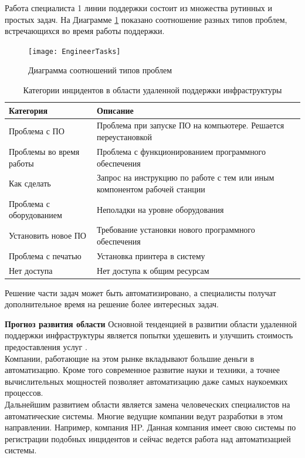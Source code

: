 Работа специалиста 1 линии поддержки состоит из множества рутинных и простых задач. На Диаграмме \ref{img:EngineerTasks}  показано соотношение разных типов проблем, встречающихся во время работы поддержки.

\begin{figure} [h] 
  \center
  \texttt{[image: EngineerTasks]}
  \caption{Диаграмма соотношений типов проблем} 
  \label{img:EngineerTasks}  
\end{figure}

\begin{table} [htbp]
  \centering
  \parbox{15cm}{\caption{Категории инцидентов в области удаленной поддержки инфраструктуры}\label{IncidentDescription}}
  \begin{tabular}{| p{7cm} || p{7cm} |}
  \hline
  \hline
Категория & Описание \\
  \hline
Проблема с ПО	& Проблема при запуске ПО на компьютере. Решается переустановкой \\
Проблемы во время работы  & Проблема с функционированием программного обеспечения\\
Как сделать & Запрос на инструкцию по работе с тем или иным компонентом рабочей станции \\
Проблема с оборудованием  & Неполадки на уровне оборудования \\
Установить новое ПО       & Требование установки нового программного обеспечения \\
Проблема с печатью        & Установка принтера в систему \\
Нет доступа               & Нет доступа к общим ресурсам \\
  \hline
  \hline
  \end{tabular}
\end{table}

Решение части задач может быть автоматизировано, а специалисты получат дополнительное время на решение более интересных задач. 


\textbf{Прогноз развития области} 
Основной тенденцией в развитии области удаленной поддержки инфраструктуры является попытки удешевить и улучшить стоимость предоставления услуг \cite{OutsourceEff}. \\
Компании, работающие на этом рынке вкладывают большие деньги в автоматизацию. Кроме того современное развитие науки и техники, а точнее вычислительных мощностей \cite{SuperComputer} позволяет автоматизацию даже самых наукоемких процессов. \\
Дальнейшим развитием области является замена человеческих специалистов на автоматические системы. Многие ведущие компании ведут разработки в этом направлении. Например, компания HP. Данная компания имеет свою системы по регистрации подобных инцидентов и сейчас ведется работа над автоматизацией системы. \\

